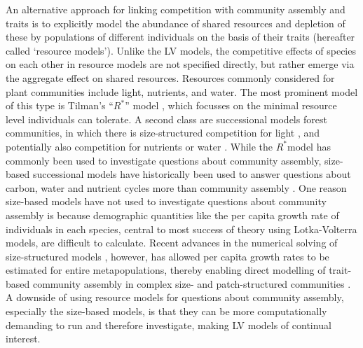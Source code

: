 \documentclass[a4paper,11pt]{article}
\newcommand{\Rstar}{\ensuremath{R^*}}
\begin{document}
An alternative approach for linking competition with community assembly and traits is to explicitly model the abundance of shared resources and depletion of these by populations of different individuals on the basis of their traits (hereafter called `resource models'). Unlike the LV models, the competitive effects of species on each other in resource models are not specified directly, but rather emerge via the aggregate effect on shared resources. Resources commonly considered for plant communities include light, nutrients, and water. The most prominent model of this type is Tilman's ``\Rstar'' model \citep{Tilman-1977, Tilman-1982}, which focusses on the minimal resource level individuals can tolerate. A second class are successional models forest communities, in which there is size-structured competition for light \citep{Huston-1987,Kohyama-1993,Moorcroft-2001,Falster-2011,Falster-2016,Weng-2020}, and potentially also competition for nutrients or water \citep{Moorcroft-2001,Farrior-2013, Smith-2014, Fisher-2018,Weng-2020}. While the \Rstar model has commonly been used to investigate questions about community assembly, size-based successional models have historically been used to answer questions about carbon, water and nutrient cycles more than community assembly \citep{Moorcroft-2001,Medvigy-2012,Smith-2014,Fisher-2018}. One reason size-based models have not used to investigate questions about community assembly is because demographic quantities like the per capita growth rate of individuals in each species, central to most success of theory using Lotka-Volterra models, are difficult to calculate. Recent advances in the numerical solving of size-structured models \citep{Falster-2016}, however, has allowed per capita growth rates to be estimated for entire metapopulations, thereby enabling direct modelling of trait-based community assembly in complex size- and patch-structured communities \cite{Falster-2017}. A downside of using resource models for questions about community assembly, especially the size-based models, is that they can be more computationally demanding to run and therefore investigate, making LV models of continual interest.
\end{document}
